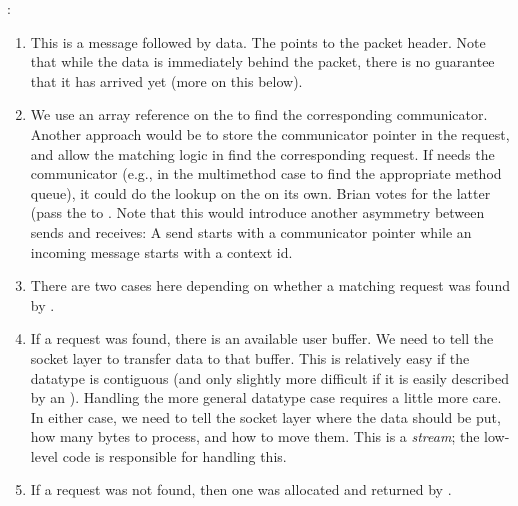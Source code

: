 :
\begin{enumerate}
\item This is a message followed by data.  The  points to the
  packet header.  Note that while the data is immediately behind the packet,
  there is no guarantee that it has arrived yet (more on this below).

\item We use an array reference on the  to find the
  corresponding communicator.  Another approach would be to store the
  communicator pointer in the request, and allow the matching logic in
   find the corresponding request.  
  If  needs the communicator (e.g., in the
  multimethod case to find the appropriate method queue), it could do the
  lookup on the  on its own.  Brian votes for the latter
  (pass the  to .  Note that
  this would introduce another asymmetry between sends and receives: A send
  starts with a communicator pointer while an incoming message starts with a
  context id.

\item There are two cases here depending on whether a matching request was
  found by .  

\item If a request was found, there is an available user buffer.  We need to
  tell the socket layer to transfer data to that buffer.  This is relatively
  easy if the datatype is contiguous (and only slightly more difficult if it
  is easily described by an ).  Handling the more general datatype
  case requires a little more care.  In either case, we need to tell the
  socket layer where the data should be put, how many bytes to process, and
  how to move them.  This is a \emph{stream}; the low-level code is
  responsible for handling this.


\item If a request was not found, then one was allocated and returned by
  .  


\end{enumerate}

